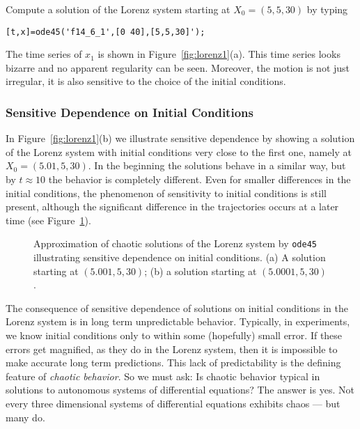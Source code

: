 \documentclass{ximera}
\begin{document}
Compute a solution of the Lorenz system starting at 
$X_0=(5,5,30)$ by typing
\begin{verbatim}
[t,x]=ode45('f14_6_1',[0 40],[5,5,30]');
\end{verbatim}
The time series of $x_1$ is shown in Figure~\ref{fig:lorenz1}(a).  This time 
series looks bizarre and no apparent regularity can be seen.  Moreover, the 
motion is not just irregular, it is also sensitive to the choice of the initial 
conditions.  


\subsubsection*{Sensitive Dependence on Initial Conditions}

In Figure~\ref{fig:lorenz1}(b) we illustrate sensitive dependence by showing  
a solution of the Lorenz system with initial conditions 
very close to the first one, namely at $X_0=(5.01,5,30)$.  In the beginning 
the solutions behave in a similar way, but by $t\approx 10$ the behavior is 
completely different.  Even for smaller 
differences in the initial conditions, the phenomenon of sensitivity to 
initial conditions is still present, although the significant difference in 
the trajectories occurs at a later time (see Figure~\ref{fig:lorenz2}).  

\begin{figure}[htb]
   \centerline{%
   }
   \caption{Approximation of chaotic solutions of the Lorenz system by 
	{\tt ode45} illustrating sensitive dependence on initial conditions.
 	 (a) A solution starting at $(5.001,5,30)$;
  	 (b) a solution starting at $(5.0001,5,30)$.}
   \label{fig:lorenz2}
\end{figure}

The consequence of sensitive dependence of solutions on initial conditions in 
the Lorenz system is in long term unpredictable behavior.  Typically, in
experiments, we know initial conditions only to within some (hopefully) small
error.  If these errors get magnified, as they do in the Lorenz system, then
it is impossible to make accurate long term predictions.  This lack of
predictability is the defining feature of {\em chaotic behavior}.
  So we must ask:  Is chaotic behavior typical in solutions to
autonomous systems of differential equations?  The answer is yes.  Not every
three dimensional systems of differential equations exhibits chaos --- but
many do.  
\end{document}
